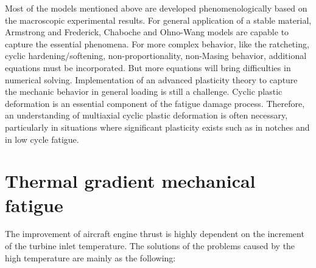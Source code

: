 Most of the models mentioned above are developed phenomenologically based on the macroscopic experimental results.
For general application of a stable material, Armstrong and Frederick, Chaboche and Ohno-Wang models are capable to capture the essential phenomena.
For more complex behavior, like the ratcheting, cyclic hardening/softening, non-proportionality, non-Masing behavior, additional equations must be incorporated.
But more equations will bring difficulties in numerical solving.
Implementation of an advanced plasticity theory to capture the mechanic behavior in general loading is still a challenge.
Cyclic plastic deformation is an essential component of the fatigue damage process.
Therefore, an understanding of multiaxial cyclic plastic deformation is often necessary, particularly in situations where significant plasticity exists such as in notches and in low cycle fatigue.


\section{Thermal gradient mechanical fatigue}
\noindent
The improvement of aircraft engine thrust is highly dependent on the increment of the turbine inlet temperature.
The solutions of the problems caused by the high temperature are mainly as the following:

